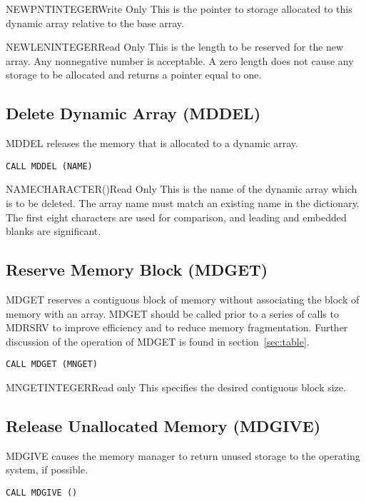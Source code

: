 \begin{argy}{NEWPNT}{INTEGER}{Write Only}
This is the pointer to storage allocated to this dynamic array relative to
the base array.
\end{argy}

\begin{argy}{NEWLEN}{INTEGER}{Read Only}
This is the length to be reserved for the new array. Any nonnegative number
is acceptable.  A zero length does not cause any storage to be allocated and
returns a pointer equal to one.
\end{argy}

\subsection{Delete Dynamic Array (MDDEL)}
MDDEL releases the memory that is allocated to a dynamic array.

\verb+CALL MDDEL (NAME)+

\begin{argy}{NAME}{CHARACTER\last(\last)}{Read Only}
This is the name of the dynamic array which is to be deleted.  The array
name must match an existing name in the dictionary.  The first eight
characters are used for comparison, and leading and embedded blanks are
significant.
\end{argy}

\subsection{Reserve Memory Block (MDGET)}
MDGET reserves a contiguous block of memory without associating the block of
memory with an array.  MDGET should be called prior to a series of calls to
MDRSRV to improve efficiency and to reduce memory fragmentation.  Further
discussion of the operation of MDGET is found in section~\ref{sec:table}.

\verb+CALL MDGET (MNGET)+

\begin{argy}{MNGET}{INTEGER}{Read only}
This specifies the desired contiguous block size.
\end{argy}

\subsection{Release Unallocated Memory (MDGIVE)}
MDGIVE causes the memory manager to return unused storage to the operating
system, if possible.

\verb+CALL MDGIVE ()+


